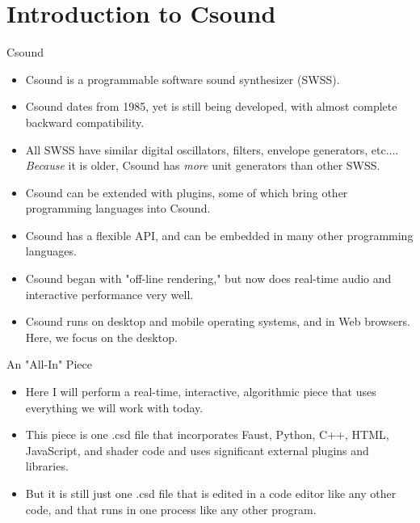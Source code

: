 \documentclass{beamer}
\begin{document}
    \section{Introduction to Csound}
    \begin{frame}{Csound}
        \begin{itemize}
            \item Csound is a programmable software sound synthesizer (SWSS).
            \item Csound dates from 1985, yet is still being developed, with almost
            complete backward compatibility.
            \item All SWSS have similar digital oscillators, filters, envelope generators, etc....
            \textit{Because} it is older, Csound has \textit{more} unit generators
            than other SWSS.
            \item Csound can be extended with plugins, some of which bring other
            programming languages into Csound. 
            \item Csound has a flexible API, and can be embedded in many other
            programming languages.
            \item Csound began with "off-line rendering," but now does real-time
            audio and interactive performance very well.
            \item Csound runs on desktop and mobile operating systems, and in Web
            browsers. Here, we focus on the desktop. 
        \end{itemize}
    \end{frame}
    \begin{frame}{An "All-In" Piece}
        \begin{itemize}
            \item Here I will perform a real-time, interactive, algorithmic piece
            that uses everything we will work with today.
            \item This piece is one .csd file that incorporates Faust, Python, C++,
            HTML, JavaScript, and shader code and uses significant external plugins and
            libraries.
            \item But it is still just one .csd file that is edited in a code editor
            like any other code, and that runs in one process like any other program.
        \end{itemize}
    \end{frame}
    
\end{document}
